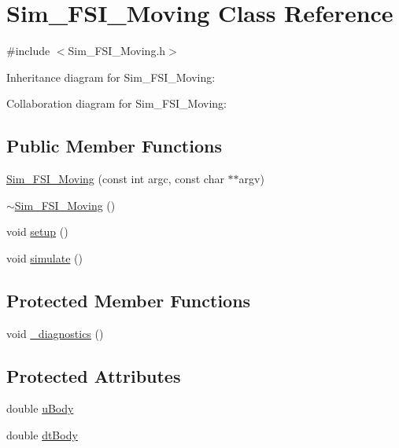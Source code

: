\hypertarget{class_sim___f_s_i___moving}{}\section{Sim\+\_\+\+F\+S\+I\+\_\+\+Moving Class Reference}
\label{class_sim___f_s_i___moving}


{\ttfamily \#include $<$Sim\+\_\+\+F\+S\+I\+\_\+\+Moving.\+h$>$}



Inheritance diagram for Sim\+\_\+\+F\+S\+I\+\_\+\+Moving\+:


Collaboration diagram for Sim\+\_\+\+F\+S\+I\+\_\+\+Moving\+:
\subsection*{Public Member Functions}
\begin{DoxyCompactItemize}
\item 
\hyperlink{class_sim___f_s_i___moving_a6bf59570d685a1bb99517fb4a1aa010e}{Sim\+\_\+\+F\+S\+I\+\_\+\+Moving} (const int argc, const char $\ast$$\ast$argv)
\item 
\hyperlink{class_sim___f_s_i___moving_a7de21a74e73f85426584ec607abc06ee}{$\sim$\+Sim\+\_\+\+F\+S\+I\+\_\+\+Moving} ()
\item 
void \hyperlink{class_sim___f_s_i___moving_a0e8ff3c8d37dfa22c3d696c526a14ad8}{setup} ()
\item 
void \hyperlink{class_sim___f_s_i___moving_ae20d894ac95fb1e13de88147a8bc1b3e}{simulate} ()
\end{DoxyCompactItemize}
\subsection*{Protected Member Functions}
\begin{DoxyCompactItemize}
\item 
void \hyperlink{class_sim___f_s_i___moving_aa858863674a7bffcdbaddb3aadd2f68d}{\+\_\+diagnostics} ()
\end{DoxyCompactItemize}
\subsection*{Protected Attributes}
\begin{DoxyCompactItemize}
\item 
double \hyperlink{class_sim___f_s_i___moving_ace539e304aaba75b7fcd10d0f48d1b90}{u\+Body}
\item 
double \hyperlink{class_sim___f_s_i___moving_a0afe565eb23a49fd97956ff02f0b755a}{dt\+Body}
\end{DoxyCompactItemize}


